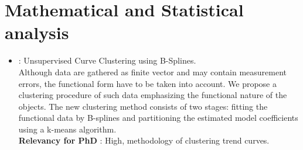 \documentclass[]{report}
\begin{document}
	\section{Mathematical and Statistical analysis}
\begin{itemize}
	
		\item \cite{abraham2003unsupervised} : Unsupervised Curve Clustering using B-Splines.
		\\ Although data are gathered as finite vector and may contain measurement
		errors, the functional form have to be taken into account. We propose a clustering procedure of
		such data emphasizing the functional nature of the objects. The new clustering method consists of
		two stages: fitting the functional data by B-splines and partitioning the estimated model coefficients
		using a k-means algorithm.
	\\\textbf{Relevancy for PhD} : High, methodology of clustering trend curves.
	

\end{itemize}
\end{document}
